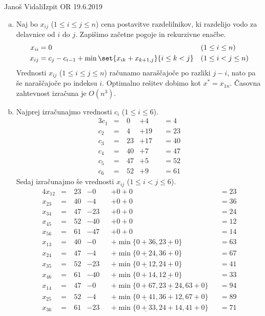 \begin{naloga}{Janoš Vidali}{Izpit OR 19.6.2019}
\begin{odgovor}
\begin{enumerate}[(a)]
\item Naj bo $x_{ij}$ ($1 \le i \le j \le n$) cena postavitve razdelilnikov,
ki razdelijo vodo za delavnice od $i$ do $j$.
Zapišimo začetne pogoje in rekurzivne enačbe.
\begin{align*}
x_{ii} &= 0 && (1 \le i \le n) \\
x_{ij} &= c_j - c_{i-1} + \min\set{x_{ik} + x_{k+1,j}}{i \le k < j}
&& (1 \le i < j \le n)
\end{align*}
Vrednosti $x_{ij}$ ($1 \le i \le j \le n$)
računamo naraščajoče po razliki $j-i$,
nato pa še naraščajoče po indeksu $i$.
Optimalno rešitev dobimo kot $x^* = x_{1n}$.
Časovna zahtevnost izračuna je $O(n^3)$.

\needspace{\baselineskip}
\item Najprej izračunajmo vrednosti $c_i$ ($1 \le i \le 6$).
\begin{alignat*}{3}
c_1 &=\ &  0 &+  4 &&=  4 \\
c_2 &=\ &  4 &+ 19 &&= 23 \\
c_3 &=\ & 23 &+ 17 &&= 40 \\
c_4 &=\ & 40 &+  7 &&= 47 \\
c_5 &=\ & 47 &+  5 &&= 52 \\
c_6 &=\ & 52 &+  9 &&= 61
\end{alignat*}
Sedaj izračunajmo še vrednosti $x_{ij}$ ($1 \le i < j \le 6$).
\begin{alignat*}{4}
x_{12} &=\ &{} 23 &-  0 &&+ 0 + 0 &&= 23 \\
x_{23} &=\ &{} 40 &-  4 &&+ 0 + 0 &&= 36 \\
x_{34} &=\ &{} 47 &- 23 &&+ 0 + 0 &&= 24 \\
x_{45} &=\ &{} 52 &- 40 &&+ 0 + 0 &&= 12 \\
x_{56} &=\ &{} 61 &- 47 &&+ 0 + 0 &&= 14 \\
x_{13} &=\ &{} 40 &-  0 &&+ \min\{0+36, \underline{23+0}\} &&= 63 \\
x_{24} &=\ &{} 47 &-  4 &&+ \min\{\underline{0+24}, 36+0\} &&= 67 \\
x_{35} &=\ &{} 52 &- 23 &&+ \min\{\underline{0+12}, 24+0\} &&= 41 \\
x_{46} &=\ &{} 61 &- 40 &&+ \min\{0+14, \underline{12+0}\} &&= 33 \\
x_{14} &=\ &{} 47 &-  0 &&+ \min\{0+67, \underline{23+24}, 63+0\} &&= 94 \\
x_{25} &=\ &{} 52 &-  4 &&+ \min\{\underline{0+41}, 36+12, 67+0\} &&= 89 \\
x_{36} &=\ &{} 61 &- 23 &&+ \min\{\underline{0+33}, 24+14, 41+0\} &&= 71 \\

\end{alignat*}
\end{enumerate}
\end{odgovor}
\end{naloga}
